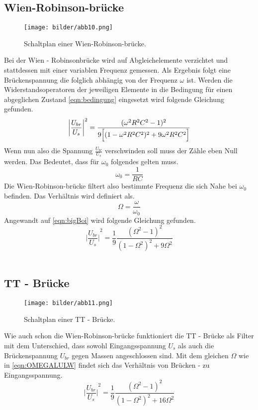 \subsection{Wien-Robinson-brücke}
\begin{figure}
    \centering
    \texttt{[image: bilder/abb10.png]}
    \caption{Schaltplan einer Wien-Robinson-brücke. \cite{skript}} 
    \label{fig:abb10}
\end{figure}
Bei der Wien - Robinsonbrücke wird auf Abgleichelemente verzichtet und stattdessen mit einer variablen Frequenz gemessen.
Als Ergebnis folgt eine Brückenspannung die folglich abhängig von der Frequenz $\omega$ ist.
Werden die Widerstandsoperatoren der jeweiligen Elemente 
in die Bedingung für einen abgeglichen Zustand \eqref{eqn:bedingung} eingesetzt wird folgende Gleichung gefunden.
\begin{equation} %
    \label{eqn:bigBoi}
    {\biggl| \frac{U_{br}}{U_s} \biggr| }^2 = \frac{(\omega ^2 R^2 C^2 -1)^2}{9\Bigl[(1-\omega ^2 R^2 C^2)^2 + 9 \omega ^2 R^2 C^2 \Bigr]}
\end{equation}
Wenn nun also die Spannung $\frac{U_{br}}{U_s}$ verschwinden soll muss der Zähle eben Null werden. Das Bedeutet, dass für 
$\omega_0$ folgendes gelten muss.
\begin{equation}
    \label{eqn:ma}
    \omega_0 = \frac{1}{RC}
\end{equation}
Die Wien-Robinson-brücke filtert also bestimmte Frequenz die sich Nahe bei $\omega_0$ befinden. Das Verhältnis wird definiert als.
\begin{equation}
    \label{eqn:OMEGALULW}
    \Omega = \frac{\omega}{\omega_0}
\end{equation}
Angewandt auf \eqref{eqn:bigBoi} wird folgende Gleichung gefunden.
\begin{equation}
    \label{eqn:ya}
    {\biggl| \frac{U_{br}}{U_s} \biggr| }^2 = \frac{1}{9}\frac{(\Omega^2 -1)^2}{(1-\Omega^2)^2+9\Omega^2}
\end{equation}
\\
\newline
\subsection{TT - Brücke}
\begin{figure}
    \centering
    \texttt{[image: bilder/abb11.png]}
    \caption{Schaltplan einer TT - Brücke. \cite{skript}} 
    \label{fig:abb11}
\end{figure}
Wie auch schon die Wien-Robinson-brücke funktioniert die TT - Brücke als Filter mit dem Unterschied, dass sowohl Eingangsspannung
$U_s$ als auch die Brückenspannung $U_{br}$ gegen Massen angeschlossen sind.
Mit dem gleichen $\Omega$ wie in \eqref{eqn:OMEGALULW} findet sich das Verhältnis von Brücken - zu Eingangsspannung.
\begin{equation}
    {\biggl| \frac{U_{br}}{U_s} \biggr| }^2 = \frac{1}{9}\frac{(\Omega^2 -1)^2}{(1-\Omega^2)^2+16\Omega^2} 
\end{equation}
\\
\newline
